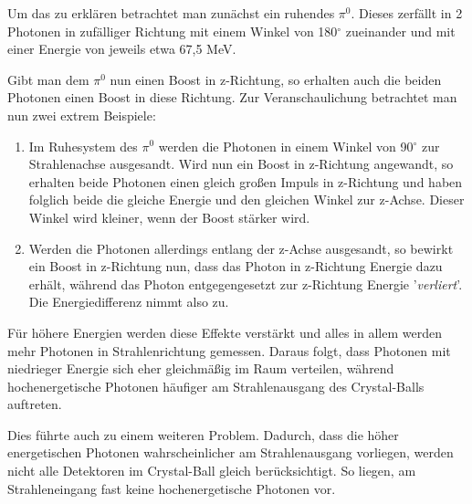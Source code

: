 \documentclass[a4paper,11pt,oneside,final,german,openbib,pdftex]{scrbook}
\begin{document}
{Um das zu erkl\"aren betrachtet man zun\"achst ein ruhendes $\pi^0$. Dieses zerf\"allt in 2 Photonen in zuf\"alliger Richtung mit einem Winkel von 180$^{\circ}$ zueinander und mit einer Energie von jeweils etwa 67,5 MeV. 

Gibt man dem $\pi^0$ nun einen Boost in z-Richtung, so erhalten auch die beiden Photonen einen Boost in diese Richtung.
Zur Veranschaulichung betrachtet man nun zwei extrem Beispiele:

\begin{enumerate}
	\item Im Ruhesystem des $\pi^0$ werden die Photonen in einem Winkel von 90$^{\circ}$ zur Strahlenachse ausgesandt. Wird nun ein Boost in z-Richtung angewandt, so erhalten beide Photonen einen gleich gro{\ss}en Impuls in z-Richtung und haben folglich beide die gleiche Energie und den gleichen Winkel zur z-Achse. Dieser Winkel wird kleiner, wenn der Boost st\"arker wird.
	\item Werden die Photonen allerdings entlang der z-Achse ausgesandt, so bewirkt ein Boost in z-Richtung nun, dass das Photon in z-Richtung Energie dazu erh\"alt, w\"ahrend das Photon entgegengesetzt zur z-Richtung Energie '\textit{verliert}'. Die Energiedifferenz nimmt also zu.
\end{enumerate}

F\"ur h\"ohere Energien werden diese Effekte verst\"arkt und alles in allem werden mehr Photonen in Strahlenrichtung gemessen. Daraus folgt, dass Photonen mit niedrieger Energie sich eher gleichm\"a{\ss}ig im Raum verteilen, w\"ahrend hochenergetische Photonen h\"aufiger am Strahlenausgang des Crystal-Balls auftreten.

Dies f\"uhrte auch zu einem weiteren Problem. Dadurch, dass die h\"oher energetischen Photonen wahrscheinlicher am Strahlenausgang vorliegen, werden nicht alle Detektoren im Crystal-Ball gleich ber\"ucksichtigt. So liegen, am Strahleneingang fast keine hochenergetische Photonen vor.


}
\end{document}
